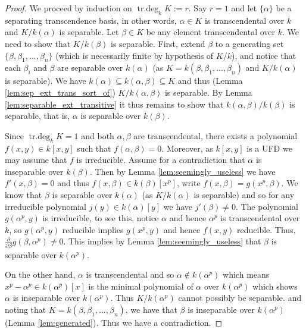 \documentclass[12pt]{article}
\theoremstyle{plain}
\theoremstyle{definition}
\begin{document}
\begin{proof}
We proceed by induction on $\operatorname{tr.deg}_kK := r$. Say $r = 1$ and let $\lbrace \alpha \rbrace$ be a separating transcendence basis, in other words, $\alpha \in K$ is transcendental over $k$ and $K/k(\alpha)$ is separable. Let $\beta \in K$ be any element transcendental over $k$. We need to show that $K/k(\beta)$ is separable. First, extend $\beta$ to a generating set $\lbrace \beta, \beta_1,...,\beta_n\rbrace$ (which is necessarily finite by hypothesis of $K/k$), and notice that each $\beta_i$ and $\beta$ are separable over $k(\alpha)$ (as $K = k(\beta,\beta_1,...,\beta_n)$ and $K/k(\alpha)$ is separable). We have $k(\alpha) \subseteq k(\alpha,\beta) \subseteq K$ and thus (Lemma \ref{lem:sep_ext_trans_sort_of}) $K/k(\alpha,\beta)$ is separable. By Lemma \ref{lem:separable_ext_transitive} it thus remains to show that $k(\alpha,\beta)/k(\beta)$ is separable, that is, $\alpha$ is separable over $k(\beta)$.

Since $\operatorname{tr.deg}_kK = 1$ and both $\alpha, \beta$ are transcendental, there exists a polynomial $f(x,y) \in k[x,y]$ such that $f(\alpha,\beta) = 0$. Moreover, as $k[x,y]$ is a UFD we may assume that $f$ is irreducible. Assume for a contradiction that $\alpha$ is inseparable over $k(\beta)$. Then by Lemma \ref{lem:seemingly_useless} we have $f'(x,\beta) = 0$ and thus $f(x,\beta) \in k(\beta)[x^p]$, write $f(x,\beta) = g(x^p,\beta)$. We know that $\beta$ is separable over $k(\alpha)$ (as $K/k(\alpha)$ is separable) and so for any irreducible polynomial $j(y) \in k(\alpha)[y]$ we have $j'(\beta) \neq 0$. The polynomial $g(\alpha^p,y)$ is irreducible, to see this, notice $\alpha$ and hence $\alpha^p$ is transcendental over $k$, so $g(\alpha^p, y)$ reducible implies $g(x^p,y)$ and hence $f(x,y)$ reducible. Thus, $\frac{\partial}{\partial\beta}g(\beta,\alpha^p) \neq 0$. This implies by Lemma \ref{lem:seemingly_useless} that $\beta$ is separable over $k(\alpha^p)$.

On the other hand, $\alpha$ is transcendental and so $\alpha \not\in k(\alpha^p)$ which means $x^p - \alpha^p \in k(\alpha^p)[x]$ is the minimal polynomial of $\alpha$ over $k(\alpha^p)$ which shows $\alpha$ is inseparable over $k(\alpha^p)$. Thus $K/k(\alpha^p)$ cannot possibly be separable.  and noting that $K = k(\beta,\beta_1,...,\beta_n)$, we have that $\beta$ is inseparable over $k(\alpha^p)$ (Lemma \ref{lem:generated}). Thus we have a contradiction.


\end{proof}
\end{document}
